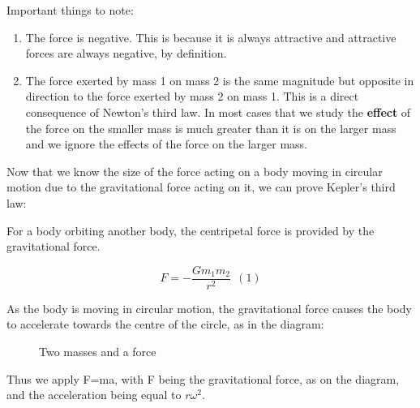 \documentclass[revision-guide.tex]{subfiles}
\begin{document}
Important things to note:

\begin{enumerate}
\def\labelenumi{\arabic{enumi}.}
\item
  The force is negative. This is because it is always attractive and
  attractive forces are always negative, by definition.
\item
  The force exerted by mass 1 on mass 2 is the same magnitude but
  opposite in direction to the force exerted by mass 2 on mass 1. This
  is a direct consequence of Newton's third law. In most cases that we
  study the \textbf{effect} of the force on the smaller mass is much
  greater than it is on the larger mass and we ignore the effects of the
  force on the larger mass.
\end{enumerate}




Now that we know the size of the force acting on a body moving in
circular motion due to the gravitational force acting on it, we can
prove Kepler's third law:

For a body orbiting another body, the centripetal force is provided by
the gravitational force.

\[F = - \frac{Gm_{1}m_{2}}{r^{2}}\ \ (1)\]

As the body is moving in circular motion, the gravitational force causes
the body to accelerate towards the centre of the circle, as in the
diagram:

\begin{figure}[h]
  \begin{center}
  \end{center}
  \label{masses-2}
  \caption{Two masses and a force}
\end{figure}

Thus we apply F=ma, with F being the gravitational force, as on the
diagram, and the acceleration being equal to $r\omega^2$.
\end{document}
